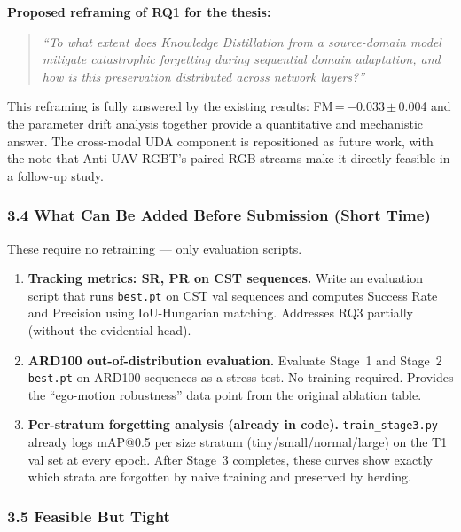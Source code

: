 \noindent \textbf{Proposed reframing of RQ1 for the thesis:}
\begin{quote}
\textit{``To what extent does Knowledge Distillation from a
source-domain model mitigate catastrophic forgetting during
sequential domain adaptation, and how is this preservation
distributed across network layers?''}
\end{quote}

\noindent This reframing is fully answered by the existing results:
FM\,=\,$-$0.033\,$\pm$\,0.004 and the parameter drift analysis
together provide a quantitative and mechanistic answer. The
cross-modal UDA component is repositioned as future work, with
the note that Anti-UAV-RGBT's paired RGB streams make it
directly feasible in a follow-up study.

\subsubsection*{3.4 What Can Be Added Before Submission (Short Time)}

These require no retraining — only evaluation scripts.

\begin{enumerate}
    \item \textbf{Tracking metrics: SR, PR on CST sequences.}
    Write an evaluation script that runs \texttt{best.pt} on CST
    val sequences and computes Success Rate and Precision using
    IoU-Hungarian matching. Addresses RQ3 partially (without the
    evidential head).

    \item \textbf{ARD100 out-of-distribution evaluation.}
    Evaluate Stage~1 and Stage~2 \texttt{best.pt} on ARD100
    sequences as a stress test. No training required. Provides
    the ``ego-motion robustness'' data point from the original
    ablation table.

    \item \textbf{Per-stratum forgetting analysis (already in code).}
    \texttt{train\_stage3.py} already logs mAP@0.5 per size stratum
    (tiny/small/normal/large) on the T1 val set at every epoch.
    After Stage~3 completes, these curves show exactly which strata
    are forgotten by naive training and preserved by herding.
\end{enumerate}

\subsubsection*{3.5 Feasible But Tight}

